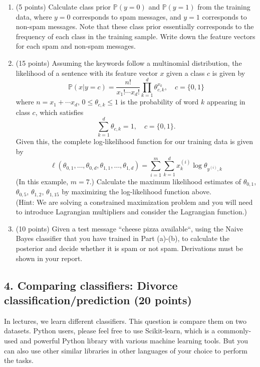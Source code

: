 \documentclass[12pt]{article}
\begin{document}
\begin{enumerate}
\item (5 points) Calculate class prior $\mathbb P(y = 0)$ and $\mathbb P(y = 1)$ from the training data, where $y = 0$ corresponds to spam messages, and $y = 1$ corresponds to non-spam messages. Note that these class prior essentially corresponds to the frequency of each class in the training sample. Write down the feature vectors for each spam and non-spam messages.



\item (15 points)  Assuming the keywords follow a multinomial distribution, the likelihood of a sentence with its feature vector $x$ given a class $c$ is given by 
\[
 \mathbb P (x|y = c) = \frac{n!}{x_1! \cdots x_d!}\prod_{k=1}^d \theta_{c, k}^{x_k}, \quad c = \{0, 1\}
\]
where $n = x_1 + \cdots x_d$, $0 \leq \theta_{c,k} \leq 1$ is the probability of word $k$ appearing in class $c$, which satisfies 
\[\sum_{k=1}^d \theta_{c,k} = 1, \quad c = \{0, 1\}.\] Given this, the complete log-likelihood function for our training data is given by
\[
\ell(\theta_{0,1}, \ldots, \theta_{0, d}, \theta_{1,1}, \ldots, \theta_{1, d}) = 
\sum_{i=1}^m \sum_{k=1}^d x_k^{(i)} \log \theta_{y^{(i)}, k}
\]
(In this example, $m = 7$.)
 Calculate the maximum likelihood estimates of $\theta_{0,1}$, $\theta_{0,5}$, $\theta_{1,2}$, $\theta_{1,15}$ by maximizing the log-likelihood function above.\\
 (Hint: We are solving a constrained maximization problem and you will need to introduce Lagrangian multipliers and consider the Lagrangian function.)

 
\item (10 points) Given a test message ``\textsf{cheese pizza available}``, using the Naive Bayes classifier that you have trained in Part (a)-(b), to calculate the posterior and decide whether it is spam or not spam. Derivations must be shown in your report.

\end{enumerate}



\subsection*{4. Comparing classifiers: Divorce classification/prediction (20 points)}

In lectures, we learn different classifiers. This question is compare them on two datasets. Python users, please feel free to use \textsf{Scikit-learn}, which is a commonly-used and powerful \textsf{Python} library with various machine learning tools. But you can also use other similar libraries in other languages of your choice to perform the tasks.
\end{document}
